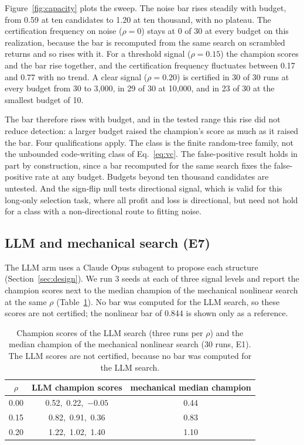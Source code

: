 \documentclass[11pt]{article}
\begin{document}
Figure~\ref{fig:capacity} plots the sweep. The noise bar rises steadily with budget, from 0.59 at ten
candidates to 1.20 at ten thousand, with no plateau. The certification frequency on noise ($\rho=0$)
stays at 0 of 30 at every budget on this realization, because the bar is recomputed from the same search on scrambled returns
and so rises with it. For a threshold signal ($\rho=0.15$) the champion scores and the bar rise together,
and the certification frequency fluctuates between 0.17 and 0.77 with no trend. A clear signal
($\rho=0.20$) is certified in 30 of 30 runs at every budget from 30 to 3{,}000, in 29 of 30 at 10{,}000,
and in 23 of 30 at the smallest budget of 10.

The bar therefore rises with budget, and in the tested range this rise did not reduce detection: a
larger budget raised the champion's score as much as it raised the bar. Four qualifications apply. The
class is the finite random-tree family, not the unbounded code-writing class of Eq.~\eqref{eq:vc}. The
false-positive result holds in part by construction, since a bar recomputed for the same search fixes
the false-positive rate at any budget. Budgets beyond ten thousand candidates are untested. And the
sign-flip null tests directional signal, which is valid for this long-only selection task, where all
profit and loss is directional, but need not hold for a class with a non-directional route to fitting
noise.

\subsection{LLM and mechanical search (E7)}
\label{sec:e7}

The LLM arm uses a Claude Opus subagent to propose each structure (Section~\ref{sec:design}). We run 3
seeds at each of three signal levels and report the champion scores next to the median champion of the
mechanical nonlinear search at the same $\rho$ (Table~\ref{tab:llm}). No bar was computed for the LLM
search, so these scores are not certified; the nonlinear bar of 0.844 is shown only as a reference.

\begin{table}[htbp]
\centering
\caption{Champion scores of the LLM search (three runs per $\rho$) and the median champion of the
mechanical nonlinear search (30 runs, E1). The LLM scores are not certified, because no bar was computed
for the LLM search.}
\label{tab:llm}
\small
\begin{tabular}{c c c}
\toprule
$\rho$ & LLM champion scores & mechanical median champion \\
\midrule
0.00 & 0.52,\ 0.22,\ $-0.05$ & 0.44 \\
0.15 & 0.82,\ 0.91,\ 0.36 & 0.83 \\
0.20 & 1.22,\ 1.02,\ 1.40 & 1.10 \\
\bottomrule
\end{tabular}
\end{table}
\end{document}
